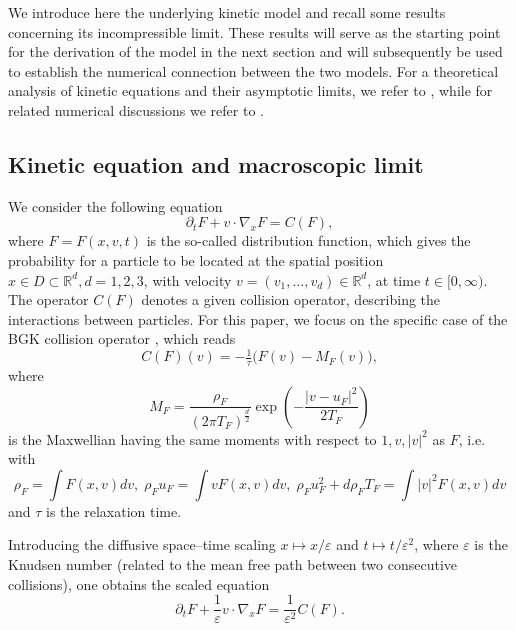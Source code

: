 \documentclass[final,11pt]{siamart251216}
\numberwithin{equation}{section}
\theoremstyle{definition}
\theoremstyle{remark}
\begin{document}
We introduce here the underlying kinetic model and recall some results concerning its incompressible limit. These results will serve as the starting point for the derivation of the model in the next section and will subsequently be used to establish the numerical connection between the two models. For a theoretical analysis of kinetic equations and their asymptotic limits, we refer to \cite{Levermore91,SR,GSR}, while for related numerical discussions we refer to \cite{Klar99,JunkKlar,JinPareschiToscani1998}. 

\subsection{Kinetic equation and macroscopic limit}
We consider the following equation
\begin{equation}
	\partial_t F + v \cdot \nabla_x F = C(F), \label{eq:kinetic}
\end{equation}
where $F = F(x,v,t)$ is the so-called distribution function, which gives the probability for a particle to be located at the spatial position $x \in D \subset \mathbb{R}^d, d=1,2,3$, with velocity $v=(v_1,\dots,v_d) \in \mathbb{R}^d$, at time $t \in [0,\infty)$.
The operator $C(F)$ denotes a given collision operator, describing the interactions between particles. 
For this paper, 
we focus on the specific case of the BGK collision operator \cite{BGK}, which reads
\begin{equation}
	C(F)(v) = -\tfrac{1}{\tau} \Big( F(v) - M_F(v) \Big), \label{eq:bgk}
\end{equation}
where 
\[
M_F = \frac{\rho_F}{(2\pi T_F)^{\frac{d}{2}}} \exp \left(- \frac{|v-u_F|^2}{2T_F}\right)
\]
is the Maxwellian having the same moments with respect to $1, v, |v|^2$ as $F$, i.e.
with $$
\rho_F = \int F(x,v ) dv , \;  \rho_F u_F = \int v F(x,v ) dv , \; \rho_F u_F^2 + d \rho_F T_F = \int \vert v \vert^2 F(x,v ) dv 
$$
and  $\tau$ is the relaxation time.
 
Introducing the diffusive space–time scaling $x \mapsto x/\varepsilon$ and $t \mapsto t/\varepsilon^2$, where $\varepsilon$ is the Knudsen number (related to the mean free path between two consecutive collisions), one obtains the scaled equation
\begin{equation}
	\partial_t F + \frac{1}{\varepsilon} v \cdot \nabla_x F
	= \frac{1}{\varepsilon^2} C(F). \label{eq:scaled}
\end{equation}
\end{document}
